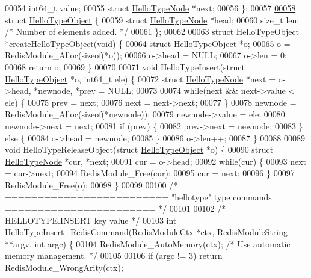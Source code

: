 \begin{DoxyCode}
00054     int64\_t value;
00055     \textcolor{keyword}{struct} \hyperlink{structHelloTypeNode}{HelloTypeNode} *next;
00056 \};
00057 
\hyperlink{structHelloTypeObject}{00058} \textcolor{keyword}{struct} \hyperlink{structHelloTypeObject}{HelloTypeObject} \{
00059     \textcolor{keyword}{struct} \hyperlink{structHelloTypeNode}{HelloTypeNode} *head;
00060     size\_t len; \textcolor{comment}{/* Number of elements added. */}
00061 \};
00062 
00063 \textcolor{keyword}{struct} \hyperlink{structHelloTypeObject}{HelloTypeObject} *createHelloTypeObject(\textcolor{keywordtype}{void}) \{
00064     \textcolor{keyword}{struct} \hyperlink{structHelloTypeObject}{HelloTypeObject} *o;
00065     o = RedisModule\_Alloc(\textcolor{keyword}{sizeof}(*o));
00066     o->head = NULL;
00067     o->len = 0;
00068     \textcolor{keywordflow}{return} o;
00069 \}
00070 
00071 \textcolor{keywordtype}{void} HelloTypeInsert(\textcolor{keyword}{struct} \hyperlink{structHelloTypeObject}{HelloTypeObject} *o, int64\_t ele) \{
00072     \textcolor{keyword}{struct} \hyperlink{structHelloTypeNode}{HelloTypeNode} *next = o->head, *newnode, *prev = NULL;
00073 
00074     \textcolor{keywordflow}{while}(next && next->value < ele) \{
00075         prev = next;
00076         next = next->next;
00077     \}
00078     newnode = RedisModule\_Alloc(\textcolor{keyword}{sizeof}(*newnode));
00079     newnode->value = ele;
00080     newnode->next = next;
00081     \textcolor{keywordflow}{if} (prev) \{
00082         prev->next = newnode;
00083     \} \textcolor{keywordflow}{else} \{
00084         o->head = newnode;
00085     \}
00086     o->len++;
00087 \}
00088 
00089 \textcolor{keywordtype}{void} HelloTypeReleaseObject(\textcolor{keyword}{struct} \hyperlink{structHelloTypeObject}{HelloTypeObject} *o) \{
00090     \textcolor{keyword}{struct} \hyperlink{structHelloTypeNode}{HelloTypeNode} *cur, *next;
00091     cur = o->head;
00092     \textcolor{keywordflow}{while}(cur) \{
00093         next = cur->next;
00094         RedisModule\_Free(cur);
00095         cur = next;
00096     \}
00097     RedisModule\_Free(o);
00098 \}
00099 
00100 \textcolor{comment}{/* ========================= "hellotype" type commands ======================= */}
00101 
00102 \textcolor{comment}{/* HELLOTYPE.INSERT key value */}
00103 \textcolor{keywordtype}{int} HelloTypeInsert\_RedisCommand(RedisModuleCtx *ctx, RedisModuleString **argv, \textcolor{keywordtype}{int} argc) \{
00104     RedisModule\_AutoMemory(ctx); \textcolor{comment}{/* Use automatic memory management. */}
00105 
00106     \textcolor{keywordflow}{if} (argc != 3) \textcolor{keywordflow}{return} RedisModule\_WrongArity(ctx);

\end{DoxyCode}
